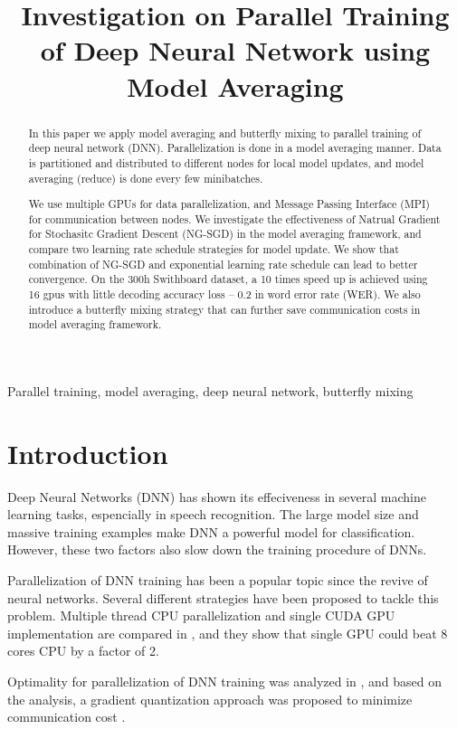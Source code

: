 \documentclass{article}
\title{Investigation on Parallel Training of Deep Neural Network using Model Averaging}
\begin{document}
%
\maketitle
%
\begin{abstract}
In this paper we apply model averaging and butterfly mixing to parallel training of deep neural network (DNN). 
Parallelization is done in a model averaging manner. Data is partitioned and distributed to different nodes for 
local model updates, and model averaging (reduce) is done every few minibatches. 

We use multiple GPUs for data parallelization, and Message Passing Interface (MPI) for communication between nodes. 
We investigate the effectiveness of Natrual Gradient for Stochasitc Gradient Descent (NG-SGD) in the model averaging
framework, and compare two learning rate schedule strategies for model update. We show that combination of 
NG-SGD and exponential learning rate schedule can lead to better convergence. On the 300h Swithboard dataset, a 10 
times speed up is achieved using 16 gpus with little decoding accuracy loss -- 0.2 in word error rate (WER). We also 
introduce a butterfly mixing strategy that can further save communication costs in model averaging framework.

\end{abstract}
%
\begin{keywords}
Parallel training, model averaging, deep neural network, butterfly mixing
\end{keywords}
%
\section{Introduction}
\label{sec:intro}
Deep Neural Networks (DNN) has shown its effeciveness in several machine learning tasks, espencially in speech
recognition. The large model size and massive training examples make DNN a powerful model for classification. However,
these two factors also slow down the training procedure of DNNs.

Parallelization of DNN training has been a popular topic since the revive of neural networks. Several different strategies
have been proposed to tackle this problem. Multiple thread CPU parallelization and single CUDA GPU implementation are compared
in \cite{scanzio2010parallel,vesely2010parallel}, and they show that single GPU could beat 8 cores CPU by a factor of 2.

Optimality for parallelization of DNN training was analyzed in \cite{seide2014parallelizability}, and based on the analysis, 
a gradient quantization approach was proposed to minimize communication cost \cite{seide20141}.
\end{document}

